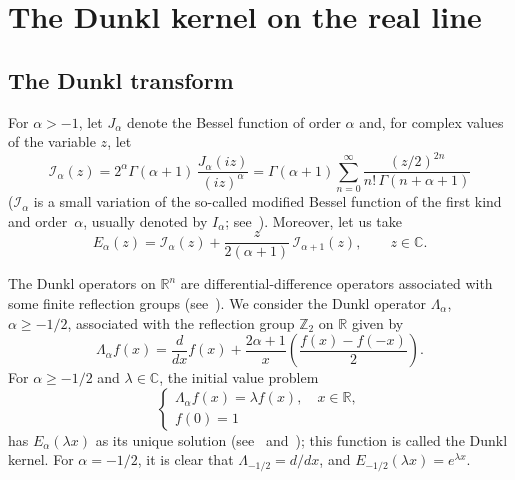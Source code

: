 \documentclass[11pt,a4paper]{amsart}
\theoremstyle{plain}
\theoremstyle{definition}
\newcommand{\Z}{\mathbb{Z}}
\newcommand{\R}{\mathbb{R}}
\newcommand{\C}{\mathbb{C}}
\newcommand{\calI}{\mathcal{I}}
\begin{document}
\section{The Dunkl kernel on the real line}
\label{sec:Dunkl}

\subsection{The Dunkl transform}
\label{sub:Dunkl}

For $\alpha > -1$, let $J_\alpha$ denote the Bessel function of order $\alpha$ and,
for complex values of the variable $z$, let
\begin{equation*}
  \calI_\alpha(z)
  = 2^\alpha \Gamma(\alpha+1)\, \frac{J_\alpha(iz)}{(iz)^\alpha}
  = \Gamma(\alpha+1) \sum_{n=0}^\infty \frac{(z/2)^{2n}}{n!\,\Gamma(n+\alpha+1)}
\end{equation*}
($\calI_\alpha$ is a small variation of the so-called modified
Bessel function of the first kind and order~$\alpha$, usually
denoted by $I_\alpha$; see~\cite{Wat}). Moreover, let us take
\begin{equation*}
  E_\alpha(z) = \calI_\alpha(z) + \frac{z}{2(\alpha+1)}\,
    \calI_{\alpha+1}(z),
  \qquad z \in \C.
\end{equation*}

The Dunkl operators on $\R^n$ are differential-difference operators
associated with some finite reflection groups (see~\cite{Dunkl}). We
consider the Dunkl operator $\Lambda_\alpha$, $\alpha \ge -1/2$, associated
with the reflection group $\Z_2$ on $\R$ given by
\begin{equation}
\label{eq:dunkloper}
  \Lambda_\alpha f(x) = \frac{d}{dx}f(x) + \frac{2\alpha+1}{x}
  \left(\frac{f(x)-f(-x)}{2}\right).
\end{equation}
For $\alpha \ge -1/2$ and $\lambda\in \C$, the initial value problem
\begin{equation}
\label{eq:dunklproblem}
\begin{cases}
  \Lambda_\alpha f(x) = \lambda f(x),\quad x\in \R, \\
  f(0) = 1
\end{cases}
\end{equation}
has $E_\alpha(\lambda x)$ as its unique solution (see~\cite{Dunkl2}
and~\cite{Jeu}); this function is called the Dunkl kernel. For $\alpha = -1/2$, it is
clear that $\Lambda_{-1/2} = d/dx$, and $E_{-1/2}(\lambda x) = e^{\lambda x}$.
\end{document}
